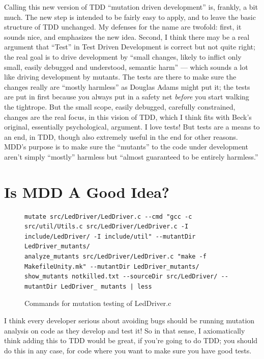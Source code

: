 \documentclass[sigplan,screen]{acmart}
\begin{document}
Calling this new version of TDD ``mutation driven development'' is, frankly,
a bit much.  The new step is intended to be fairly easy to apply, and
to leave the basic structure of TDD unchanged.  My defenses for
the name are
twofold:  first, it sounds nice, and emphasizes the new idea.  Second,
I think there may be a real  argument that ``Test'' in Test Driven Development
is correct but not quite right; the real goal is to drive development
by ``small changes, likely to inflict only small, easily debugged and understood, semantic harm'' ---
which sounds a lot like driving development by mutants.  The tests are
there to make sure the changes really are ``mostly harmless'' as Douglas
Adams might put it; the tests are put in first because you always put
in a safety net \emph{before} you start walking the tightrope.  But
the small scope, easily debugged, carefully constrained, changes are
the real focus, in this vision of TDD, which I think fits with Beck's
original, essentially psychological, argument.  I love tests!  But
tests are a means to an end, in TDD, though also extremely useful in
the end for other reasons.  MDD's purpose is to make sure the
``mutants'' to the code under development aren't simply ``mostly''
harmless but ``almost guaranteed to be entirely harmless.''

\section{Is MDD A Good Idea?}


\begin{figure}[t]
  {\scriptsize
\begin{verbatim}
mutate src/LedDriver/LedDriver.c --cmd "gcc -c src/util/Utils.c src/LedDriver/LedDriver.c -I include/LedDriver/ -I include/util" --mutantDir LedDriver_mutants/
analyze_mutants src/LedDriver/LedDriver.c "make -f MakefileUnity.mk" --mutantDir LedDriver_mutants/
show_mutants notkilled.txt --sourceDir src/LedDriver/ --mutantDir LedDriver_ mutants | less
\end{verbatim}
    }
  \caption{Commands for mutation testing of LedDriver.c}
  \label{fig:led}
\end{figure}

I think every developer serious about avoiding bugs should be running
mutation analysis on code as they develop and test it!  So in that
sense, I axiomatically think adding this to TDD would be great, if
you're going to do TDD; you should do this in any case, for code where
you want to make sure you have good tests.
\end{document}
